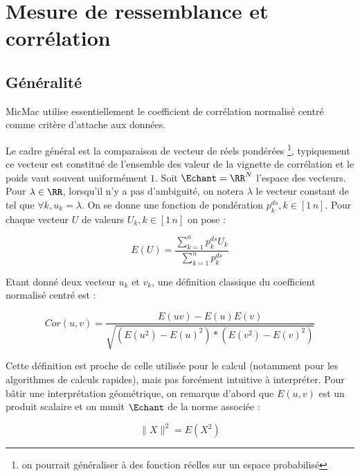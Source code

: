 \chapter{Mesure de ressemblance et corr\'elation}

\label{CHAP:COREL}


\section{G\'en\'eralit\'e}

MicMac utilise essentiellement le coefficient de corr\'elation 
normalis\'e centr\'e comme crit\`ere d'attache aux donn\'ees.

Le cadre g\'en\'eral est la comparaison de vecteur de r\'eels
pond\'er\'ees \footnote{on pourrait g\'en\'eraliser 
\`a des fonction r\'eelles sur un espace probabilis\'e}, typiquement
ce vecteur est constitu\'e de l'ensemble des valeur de la vignette
de corr\'elation et le poids vaut souvent uniform\'ement $1$.
Soit  $\Echant=\RR^N$ l'espace des vecteurs.
Pour  $\lambda \in \RR$, lorsqu'il n'y a pas d'ambiguit\'e,
  on notera  $\lambda$ le vecteur
constant de \Echant  tel que $\forall k, u_k=\lambda $.
On se donne une fonction de pond\'eration $p^{ds}_k ,k\in[1 \, n]$.
Pour chaque  vecteur $U$ de valeurs $U_k, k \in [1 \, n]$ on pose :

\begin{equation}
   E(U) =  \frac{\sum^n_{k=1} p^{ds}_k U_k}{\sum^n_{k=1}  p^{ds}_k}
\end{equation}

Etant donn\'e deux  vecteur $u_k$ et $v_k$, une d\'efinition classique du 
coefficient normalis\'e centr\'e est :

\begin{equation}
   Cor(u,v) =  \frac{E(uv)-E(u)E(v)}{\sqrt{(E(u^2)-E(u)^2)*(E(v^2)-E(v)^2)}}
\end{equation}

Cette d\'efinition est proche de celle utilis\'ee pour le calcul 
(notamment pour les algorithmes de calculs rapides), mais pas forc\'ement intuitive
\`a interpr\'eter. Pour b\^atir une interpr\'etation 
g\'eom\'etrique, on remarque d'abord que $E(u,v)$ est un produit scalaire et
on munit $\Echant$  de la norme associ\'ee :

\begin{equation}
   \| X \|^2 =  E(X^2)  
\end{equation}

